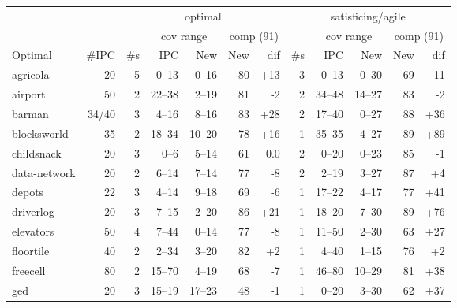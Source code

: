 \documentclass{article}
\begin{document}
            \begin{table} \centering
            \begin{tabular}{l@{}rr|rrrr|r|rrrr}
& & \multicolumn{5}{c}{optimal} & \multicolumn{5}{c}{satisficing/agile} \\

& & & \multicolumn{2}{c}{cov range} & \multicolumn{2}{c}{comp (91)} & & \multicolumn{2}{c}{cov range} & \multicolumn{2}{c}{comp (91)} \\

      Optimal & \#IPC & \#s &     IPC &    New & New &               dif & \#s &      IPC &    New & New &               dif \\
\midrule
     agricola &    20 &   5 &   0--13 &  0--16 &  80 & {\color{blue}+13} &   3 &    0--13 &  0--30 &  69 &  {\color{red}-11} \\
      airport &    50 &   2 &  22--38 &  2--19 &  81 &   {\color{red}-2} &   2 &   34--48 & 14--27 &  83 &   {\color{red}-2} \\
       barman & 34/40 &   3 &   4--16 &  8--16 &  83 & {\color{blue}+28} &   2 &   17--40 &  0--27 &  88 & {\color{blue}+36} \\
  blocksworld &    35 &   2 &  18--34 & 10--20 &  78 & {\color{blue}+16} &   1 &   35--35 &  4--27 &  89 & {\color{blue}+89} \\
   childsnack &    20 &   3 &    0--6 &  5--14 &  61 &               0.0 &   2 &    0--20 &  0--23 &  85 &   {\color{red}-1} \\
 data-network &    20 &   2 &   6--14 &  7--14 &  77 &   {\color{red}-8} &   2 &    2--19 &  3--27 &  87 &  {\color{blue}+4} \\
       depots &    22 &   3 &   4--14 &  9--18 &  69 &   {\color{red}-6} &   1 &   17--22 &  4--17 &  77 & {\color{blue}+41} \\
    driverlog &    20 &   3 &   7--15 &  2--20 &  86 & {\color{blue}+21} &   1 &   18--20 &  7--30 &  89 & {\color{blue}+76} \\
    elevators &    50 &   4 &   7--44 &  0--14 &  77 &   {\color{red}-8} &   1 &   11--50 &  2--30 &  63 & {\color{blue}+27} \\
    floortile &    40 &   2 &   2--34 &  3--20 &  82 &  {\color{blue}+2} &   1 &    4--40 &  1--15 &  76 &  {\color{blue}+2} \\
     freecell &    80 &   2 &  15--70 &  4--19 &  68 &   {\color{red}-7} &   1 &   46--80 & 10--29 &  81 & {\color{blue}+38} \\
          ged &    20 &   3 &  15--19 & 17--23 &  48 &   {\color{red}-1} &   1 &    0--20 &  3--30 &  62 & {\color{blue}+37} \\

\end{tabular}
\end{table}
\end{document}

